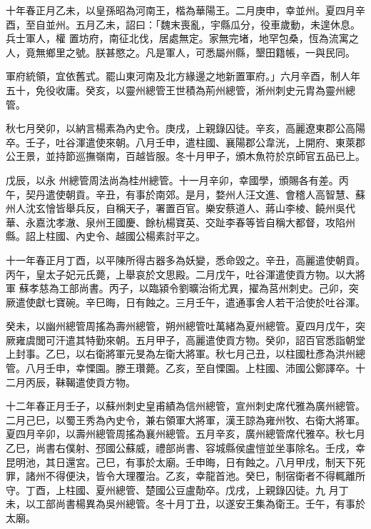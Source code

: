 \begin{pinyinscope}
 十年春正月乙未，以皇孫昭為河南王，楷為華陽王。二月庚申，幸並州。夏四月辛酉，至自並州。五月乙未，詔曰：「魏末喪亂，宇縣瓜分，役車歲動，未遑休息。兵士軍人，權
 置坊府，南征北伐，居處無定。家無完堵，地罕包桑，恆為流寓之人，竟無鄉里之號。朕甚愍之。凡是軍人，可悉屬州縣，墾田籍帳，一與民同。



 軍府統領，宜依舊式。罷山東河南及北方緣邊之地新置軍府。」六月辛酉，制人年五十，免役收庸。癸亥，以靈州總管王世積為荊州總管，淅州刺史元胄為靈州總管。



 秋七月癸卯，以納言楊素為內史令。庚戌，上親錄囚徒。辛亥，高麗遼東郡公高陽卒。壬子，吐谷渾遣使來朝。八月壬申，遣柱國、襄陽郡公韋洸，上開府、東萊郡公王景，並持節巡撫嶺南，百越皆服。冬十月甲子，頒木魚符於京師官五品已上。



 戊辰，以永
 州總管周法尚為桂州總管。十一月辛卯，幸國學，頒賜各有差。丙午，契丹遣使朝貢。辛丑，有事於南郊。是月，婺州人汪文進、會稽人高智慧、蘇州人沈玄懀皆舉兵反，自稱天子，署置百官。樂安蔡道人、蔣山李棱、饒州吳代華、永嘉沈孝澈、泉州王國慶、餘杭楊寶英、交趾李春等皆自稱大都督，攻陷州縣。詔上柱國、內史令、越國公楊素討平之。



 十一年春正月丁酉，以平陳所得古器多為妖變，悉命毀之。辛丑，高麗遣使朝貢。丙午，皇太子妃元氏薨，上舉哀於文思殿。二月戊午，吐谷渾遣使貢方物。以大將軍
 蘇孝慈為工部尚書。丙子，以臨潁令劉曠治術尤異，擢為莒州刺史。己卯，突厥遣使獻七寶碗。辛巳晦，日有蝕之。三月壬午，遣通事舍人若干洽使於吐谷渾。



 癸未，以幽州總管周搖為壽州總管，朔州總管吐萬緒為夏州總管。夏四月戊午，突厥雍虞閭可汗遣其特勤來朝。五月甲子，高麗遣使貢方物。癸卯，詔百官悉詣朝堂上封事。乙巳，以右衛將軍元旻為左衛大將軍。秋七月己丑，以柱國杜彥為洪州總管。八月壬申，幸慄園。滕王瓚薨。乙亥，至自慄園。上柱國、沛國公鄭譯卒。十二月丙辰，靺鞨遣使貢方物。



 十二年春正月壬子，以蘇州刺史皇甫績為信州總管，宣州刺史席代雅為廣州總管。二月己巳，以蜀王秀為內史令，兼右領軍大將軍，漢王諒為雍州牧、右衛大將軍。夏四月辛卯，以壽州總管周搖為襄州總管。五月辛亥，廣州總管席代雅卒。秋七月乙巳，尚書右僕射、邳國公蘇威，禮部尚書、容城縣侯盧愷並坐事除名。壬戌，幸昆明池，其日還宮。己巳，有事於太廟。壬申晦，日有蝕之。八月甲戌，制天下死罪，諸州不得便決，皆令大理覆治。乙亥，幸龍首池。癸巳，制宿衛者不得輒離所守。丁酉，上柱國、夏州總管、楚國公豆盧勣卒。戊戌，上親錄囚徒。九
 月丁未，以工部尚書楊異為吳州總管。冬十月丁丑，以遂安王集為衛王。壬午，有事於太廟。




\end{pinyinscope}
